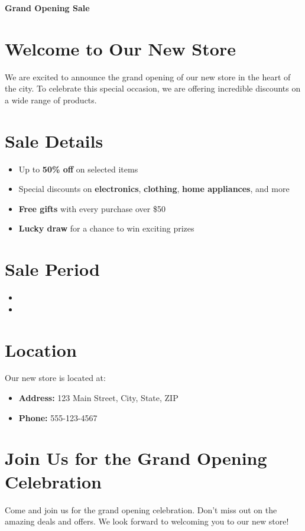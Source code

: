 \documentclass{article}
\begin{document}
\begin{center}
    
    
    \textbf{\huge Grand Opening Sale}
\end{center}

\section*{Welcome to Our New Store}

We are excited to announce the grand opening of our new store in the heart of the city. To celebrate this special occasion, we are offering incredible discounts on a wide range of products.

\section*{Sale Details}
\begin{itemize}[label={}, leftmargin=*, itemsep=5pt]
    \item Up to \textbf{50\% off} on selected items
    \item Special discounts on \textbf{electronics}, \textbf{clothing}, \textbf{home appliances}, and more
    \item \textbf{Free gifts} with every purchase over \$50
    \item \textbf{Lucky draw} for a chance to win exciting prizes
\end{itemize}

\section*{Sale Period}
\begin{itemize}[label={}, leftmargin=*, itemsep=5pt]
    \item {}
    \item {} 
\end{itemize}

\section*{Location}
Our new store is located at:
\begin{itemize}[label={}, leftmargin=*, itemsep=5pt]
    \item \textbf{Address:} 123 Main Street, City, State, ZIP
    \item \textbf{Phone:} 555-123-4567
\end{itemize}

\section*{Join Us for the Grand Opening Celebration}

Come and join us for the grand opening celebration. Don't miss out on the amazing deals and offers. We look forward to welcoming you to our new store!
\end{document}
